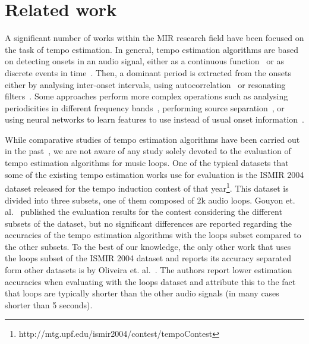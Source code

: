 \documentclass{article}
\begin{document}
\section{Related work}\label{sec:related_work}
A significant number of works within the MIR research field have been focused on the task of tempo estimation. 
In general, tempo estimation algorithms are based on detecting onsets in an audio signal, either as a continuous function~\cite{Davies2007a,Oliveira2010,Percival2014} or as discrete events in time~\cite{Dixon2001}. Then, a dominant period is extracted from the onsets either by analysing inter-onset intervals, using autocorrelation~\cite{Grosche2010} or resonating filters~\cite{Klapuri2006}. 
Some approaches perform more complex operations such as analysing periodicities in different frequency bands~\cite{Gainza2011,Wu2014}, performing source separation~\cite{Gkiokas2012,Elowsson2013}, or using neural networks to learn features to use instead of usual onset information~\cite{Sebastian2015}.

While comparative studies of tempo estimation algorithms have been carried out in the past~\cite{Gouyon2006,Zapata2011}, we are not aware of any study solely devoted to the evaluation of tempo estimation algorithms for music loops.
One of the typical datasets that some of the existing tempo estimation works use for evaluation is the ISMIR 2004 dataset released for the tempo induction contest of that year\footnote{http://mtg.upf.edu/ismir2004/contest/tempoContest}. This dataset is divided into three subsets, one of them composed of 2k audio loops. Gouyon et. al.~\cite{Gouyon2006} published the evaluation results for the contest considering the different subsets of the dataset, but no significant differences are reported regarding the accuracies of the tempo estimation algorithms with the loops subset compared to the other subsets. 
To the best of our knowledge, the only other work that uses the loops subset of the ISMIR 2004 dataset and reports its accuracy separated form other datasets is by Oliveira et. al.~\cite{Oliveira2010}. The authors report lower estimation accuracies when evaluating with the loops dataset and attribute this to the fact that loops are typically shorter than the other audio signals (in many cases shorter than 5 seconds).
\end{document}
